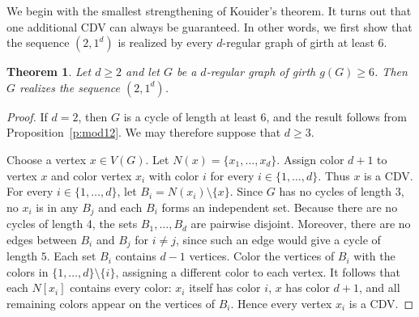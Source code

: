 \documentclass{article}
\newtheorem{theorem}{Theorem}[section]
\theoremstyle{definition}
\begin{document}
We begin with the smallest strengthening of Kouider's theorem. It turns out that one additional CDV can always be guaranteed. In other words, we first show that the sequence $(2,1^d)$ is realized by every $d$-regular graph of girth at least $6$.

\begin{theorem}\label{t:girth6}
Let $d\ge 2$ and let $G$ be a $d$-regular graph of girth $g(G)\ge 6$.
Then $G$ realizes the sequence $(2,1^d)$.
\end{theorem}

\begin{proof}

If $d=2$, then $G$ is a cycle of length at least $6$, and the result follows from Proposition~\ref{p:mod12}. We may therefore suppose that $d\geq 3$.

Choose a vertex $x\in V(G)$. Let $N(x)=\{x_1,\ldots,x_d\}$. Assign color $d+1$ to vertex $x$ and color vertex $x_i$ with color $i$ for every $i\in\{1,\ldots,d\}$. Thus $x$ is a CDV. For every $i\in\{1,\ldots,d\}$, let $B_i=N(x_i)\setminus\{x\}$. 
Since $G$ has no cycles of length $3$,
no $x_i$ is in any $B_j$ and each $B_i$ forms an independent set.
Because there are no cycles of length 4, the sets $B_1,\ldots,B_d$ are pairwise disjoint.
Moreover, there are no edges between $B_i$ and $B_j$ for $i\neq j$, since such an edge would give a cycle of length $5$. Each set $B_i$ contains $d-1$ vertices. Color the vertices of $B_i$ with the colors in
$\{1,\ldots,d\}\setminus\{i\}$, assigning a different color to each vertex. It follows that each $N[x_i]$ contains every color: $x_i$ itself has color $i$, $x$ has color $d+1$, and all remaining colors appear on the vertices of $B_i$. Hence every vertex $x_i$ is a CDV. 


\end{proof}
\end{document}
